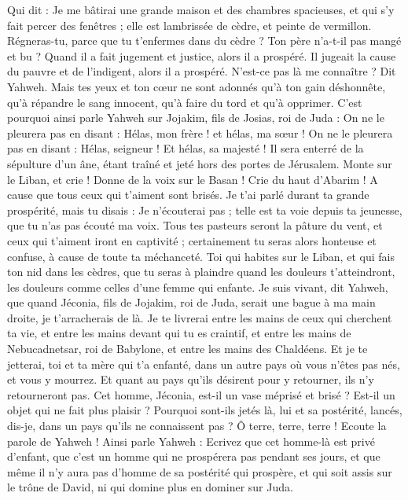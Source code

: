 \begin{multicols}{2}
Qui dit : Je me bâtirai une grande maison et des chambres spacieuses, et qui s'y fait percer des fenêtres ; elle est lambrissée de cèdre, et peinte de vermillon.
Régneras-tu, parce que tu t’enfermes dans du cèdre ? Ton père n'a-t-il pas mangé et bu ? Quand il a fait jugement et justice, alors il a prospéré.
Il jugeait la cause du pauvre et de l'indigent, alors il a prospéré. N'est-ce pas là me connaître ? Dit Yahweh.
Mais tes yeux et ton cœur ne sont adonnés qu'à ton gain déshonnête, qu'à répandre le sang innocent, qu'à faire du tord et qu'à opprimer.
C'est pourquoi ainsi parle Yahweh sur Jojakim, fils de Josias, roi de Juda : On ne le pleurera pas en disant : Hélas, mon frère ! et hélas, ma sœur ! On ne le pleurera pas en disant : Hélas, seigneur ! Et hélas, sa majesté !
Il sera enterré de la sépulture d'un âne, étant traîné et jeté hors des portes de Jérusalem.
Monte sur le Liban, et crie ! Donne de la voix sur le Basan ! Crie du haut d'Abarim ! A cause que tous ceux qui t'aiment sont brisés.
Je t'ai parlé durant ta grande prospérité, mais tu disais : Je n'écouterai pas ; telle est ta voie depuis ta jeunesse, que tu n'as pas écouté ma voix.
Tous tes pasteurs seront la pâture du vent, et ceux qui t'aiment iront en captivité ; certainement tu seras alors honteuse et confuse, à cause de toute ta méchanceté.
Toi qui habites sur le Liban, et qui fais ton nid dans les cèdres, que tu seras à plaindre quand les douleurs t'atteindront, les douleurs comme celles d'une femme qui enfante.
Je suis vivant, dit Yahweh, que quand Jéconia, fils de Jojakim, roi de Juda, serait une bague à ma main droite, je t'arracherais de là.
Je te livrerai entre les mains de ceux qui cherchent ta vie, et entre les mains devant qui tu es craintif, et entre les mains de Nebucadnetsar, roi de Babylone, et entre les mains des Chaldéens.
Et je te jetterai, toi et ta mère qui t'a enfanté, dans un autre pays où vous n'êtes pas nés, et vous y mourrez.
Et quant au pays qu'ils désirent pour y retourner, ils n'y retourneront pas.
Cet homme, Jéconia, est-il un vase méprisé et brisé ? Est-il un objet qui ne fait plus plaisir ? Pourquoi sont-ils jetés là, lui et sa postérité, lancés, dis-je, dans un pays qu'ils ne connaissent pas ?
Ô terre, terre, terre ! Ecoute la parole de Yahweh !
Ainsi parle Yahweh : Ecrivez que cet homme-là est privé d'enfant, que c'est un homme qui ne prospérera pas pendant ses jours, et que même il n'y aura pas d'homme de sa postérité qui prospère, et qui soit assis sur le trône de David, ni qui domine plus en dominer sur Juda.

\end{multicols}

